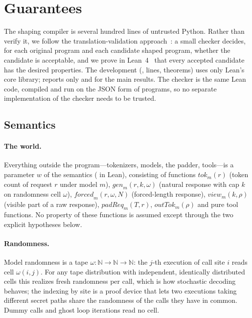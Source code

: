 \section{Guarantees}\label{sec:formal}

The shaping compiler is several hundred lines of untrusted Python. Rather than verify it, we follow the translation-validation approach~\cite{pnueli1998tv,necula2000tv}: a small checker decides, for each original program and each candidate shaped program, whether the candidate is acceptable, and we prove in Lean~4~\cite{moura2021lean4} that every accepted candidate has the desired properties. The development (, \leanLines{} lines, \leanTheorems{} theorems) uses only Lean's core library;  reports only  and  for the main results. The checker is the same Lean code, compiled and run on the JSON form of programs, so no separate implementation of the checker needs to be trusted.

\subsection{Semantics}\label{sec:semantics}

\paragraph{The world.} Everything outside the program---tokenizers, models, the padder, tools---is a parameter $w$ of the semantics ( in Lean), consisting of functions
$\mathit{tok}_m(r)$ (token count of request $r$ under model $m$),
$\mathit{gen}_m(r, k, \omega)$ (natural response with cap $k$ on randomness cell $\omega$),
$\mathit{forced}_m(r, \omega, N)$ (forced-length response),
$\mathit{view}_m(k, \rho)$ (visible part of a raw response),
$\mathit{padReq}_m(T, r)$,
$\mathit{outTok}_m(\rho)$ and pure tool functions. No property of these functions is assumed except through the two explicit hypotheses below.

\paragraph{Randomness.} Model randomness is a tape $\omega : \mathbb{N} \to \mathbb{N} \to \mathbb{N}$: the $j$-th execution of call site $i$ reads cell $\omega(i, j)$. For any tape distribution with independent, identically distributed cells this realizes fresh randomness per call, which is how stochastic decoding behaves; the indexing by site is a proof device that lets two executions taking different secret paths share the randomness of the calls they have in common. Dummy calls and ghost loop iterations read no cell.

